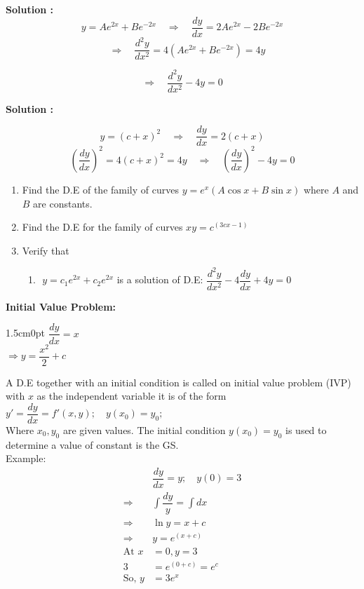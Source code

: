 \documentclass[a4aper,12pt]{report}
\begin{document}
\vspace{1em}
\begin{tcolorbox}[breakable, title = {\textbf{Example : }Find the D.E of the relation $y = Ae^{2x} + Be^{-2x} $, where A, B are constants.}]
    \textbf{Solution : }
\[
y = Ae^{2x} + Be^{-2x}
\quad \Rightarrow \quad \frac{dy}{dx} = 2Ae^{2x} - 2Be^{-2x}\]
\[
\quad \Rightarrow \quad \frac{d^2y}{dx^2} = 4(Ae^{2x} + Be^{-2x}) = 4y
\]

\[
\Rightarrow \quad \frac{d^2y}{dx^2} - 4y = 0
\]

\end{tcolorbox}

 \begin{tcolorbox}[breakable, title = {\textbf{Example : }Find the DE of the relation \( y = (c + x)^2 \)}]
    \textbf{Solution : }

\[
y = (c + x)^2
\quad \Rightarrow \quad \frac{dy}{dx} = 2(c + x)
\]
\[
\left( \frac{dy}{dx} \right)^2 = 4(c + x)^2 = 4y
\quad \Rightarrow \quad \left( \frac{dy}{dx} \right)^2 - 4y = 0
\]
 \end{tcolorbox}
\begin{tcolorbox}[breakable, title = H.W:]
    \begin{enumerate}
    \item Find the D.E of the family of curves $y=e^x(A\cos x+B\sin x)$ where $A$ and $B$ are constants. 
    \item Find the D.E for the family of curves $xy=c^{(3cx-1)}$
    \item Verify that 
    \begin{enumerate}
        \item $\,\,y=c_1e^{2x}+c_2e^{2x}$ is a solution of D.E: $\dfrac{d^2y}{dx^2}-4\dfrac{dy}{dx}+4y=0$  
      \end{enumerate}
\end{enumerate}
\end{tcolorbox}

\noindent \textbf{Initial Value Problem: } \\
\begin{adjustwidth}{1.5cm}{0pt}
    $\dfrac{dy}{dx}=x$ \\ 
    $\Rightarrow y = \dfrac{x^2}{2}+c$
\end{adjustwidth}
A D.E together with an initial condition is called on initial value problem (IVP) with $x$ as the independent variable it is of the form $y' = \dfrac{dy}{dx} = f'(x,y);\quad y(x_0) = y_0;$ \\ [5pt]
Where $x_0,y_0$ are given values. The initial condition $y(x_0)=y_0$ is used to determine a value of constant is the GS. \\ [5pt]
Example: 
\begin{align*}
    &\dfrac{dy}{dx} = y; \quad y(0) = 3 \\ 
    \Rightarrow \,\, & \int \dfrac{dy}{y} = \int dx \\ 
    \Rightarrow\,\, & \ln y = x+c \\ 
    \Rightarrow \,\, &y = e^{(x+c)} \\ 
    \text{At }  x&=0, y =3 \\ 
    3 &= e^{(0+c)} = e^c \\ 
    \text{So, }y &= 3e^x
\end{align*}
\end{document}
